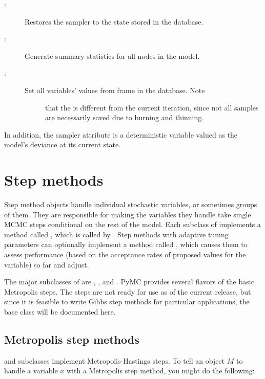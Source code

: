 \documentclass[letterpaper,10pt,english]{sphinxmanual}
\begin{document}
\begin{description}
\item[{:}] \leavevmode
Restores the sampler to the state stored in the database.

\item[{:}] \leavevmode
Generate summary statistics for all nodes in the model.

\item[{:}] \leavevmode\begin{description}
\item[{Set all variables' values from frame  in the database. Note}] \leavevmode
that the  is different from the current iteration, since not
all samples are necessarily saved due to burning and thinning.

\end{description}

\end{description}

In addition, the sampler attribute  is a deterministic variable valued as the model's deviance at its current state.


\section{Step methods}
\label{modelfitting:sec-stepmethod}\label{modelfitting:step-methods}
Step method objects handle individual stochastic variables, or sometimes groups of them. They are responsible for making the variables they handle take single MCMC steps conditional on the rest of the model. Each subclass of  implements a method called , which is called by . Step methods with adaptive tuning parameters can optionally implement a method called , which causes them to assess performance (based on the acceptance rates of proposed values for the variable) so far and adjust.

The major subclasses of  are , ,  and . PyMC provides several flavors of the basic Metropolis steps. The  steps are not ready for use as of the current release, but since it is feasible to write Gibbs step methods for particular applications, the  base class will be documented here.


\subsection{Metropolis step methods}
\label{modelfitting:metropolis}\label{modelfitting:metropolis-step-methods}
 and subclasses implement Metropolis-Hastings steps. To tell an  object $M$ to handle a variable $x$ with a Metropolis step method, you might do the following:
\end{document}
